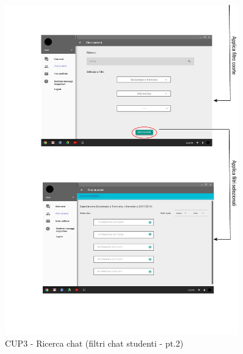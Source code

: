 \begin{figure}
	\centering
	\includegraphics[width=0.9\textwidth]{imgs/gruppo6/activities/act_cup3_filtro_chat_studenti2.pdf}
	\caption{CUP3 - Ricerca chat (filtri chat studenti - pt.2)}
	\label{fig:act-cup3-4}
\end{figure}

